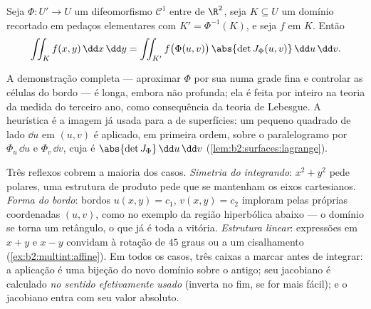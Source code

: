 \begin{theorem}\label{thm:b2:multint:changevar}
Seja $\Phi \colon U' \to U$ um difeomorfismo $\mathcal{C}^1$
entre  de $\R^2$, seja $K \subseteq U$ um domínio
 recortado em pedaços elementares com $K' = \Phi^{-1}(K)$, e
seja $f$  em $K$. Então
\[
\iint_K f(x, y)\,\dd x\,\dd y
= \iint_{K'} f\bigl(\Phi(u, v)\bigr)\,
\abs{\det J_\Phi(u, v)}\,\dd u\,\dd v .
\]
\end{theorem}
\admitted

\begin{remark}
A demonstração completa --- aproximar $\Phi$ por sua  numa
grade fina e controlar as células do bordo --- é longa, embora
não profunda; ela é feita por inteiro na teoria da medida do terceiro ano, como
consequência da teoria de Lebesgue. A heurística é a imagem
já usada para a  de superfícies: um pequeno quadrado de lado $\dd u$ em
$(u, v)$ é aplicado, em primeira ordem, sobre o paralelogramo 
por $\Phi_u\,\dd u$ e $\Phi_v\,\dd v$, cuja  é
$\abs{\det J_\Phi}\,\dd u\,\dd v$
(\cref{lem:b2:surfaces:lagrange}).
\end{remark}

\begin{remark}
Três reflexos cobrem a maioria dos casos. \emph{Simetria do
integrando}: $x^2 + y^2$ pede polares, uma estrutura de produto
pede que se mantenham os eixos cartesianos. \emph{Forma do
bordo}: bordos $u(x,y) = c_1$, $v(x,y) = c_2$ imploram pelas
próprias coordenadas $(u, v)$, como no exemplo da região
hiperbólica abaixo --- o domínio se torna um retângulo,
o que já é toda a vitória. \emph{Estrutura linear}:
expressões em $x + y$ e $x - y$ convidam à rotação de
$45$ graus ou a um cisalhamento (\cref{ex:b2:multint:affine}). Em todos
os casos, três caixas a marcar antes de integrar: a aplicação é uma
bijeção do novo domínio sobre o antigo; seu jacobiano
é calculado \emph{no sentido efetivamente usado} (inverta no
fim, se for mais fácil); e o jacobiano entra com seu
valor absoluto.
\end{remark}

